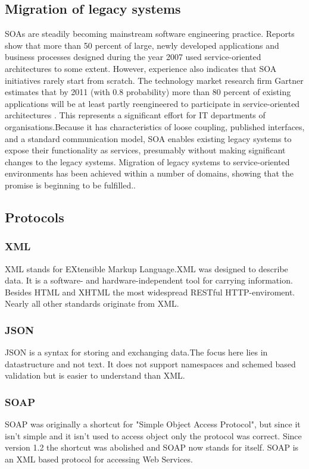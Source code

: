 \documentclass[12pt]{article}
\begin{document}
\subsection{Migration of legacy systems}
SOAs are steadily becoming mainstream software engineering practice. Reports show that more than 50 percent of large, newly developed applications and business processes designed during the year 2007 used service-oriented architectures to some extent. However, experience also indicates that SOA initiatives rarely start from scratch. The technology market research firm Gartner estimates that by 2011 (with 0.8 probability) more than 80 percent of existing applications will be at least partly reengineered to participate in service-oriented architectures . This represents a significant effort for IT departments of organisations.Because it has characteristics of loose coupling, published interfaces, and a standard communication model, SOA enables existing legacy systems to expose their functionality as services, presumably without making significant changes to the legacy systems. Migration of legacy systems to service-oriented environments has been achieved within a number of domains, showing that the promise is beginning to be fulfilled.\cite{legacy}.
\\
\subsection{Protocols}

\subsubsection{XML}
XML stands for EXtensible Markup Language.XML was designed to describe data.
It is a software- and hardware-independent tool for carrying information.\\
Besides HTML and XHTML the most widespread RESTful HTTP-enviroment.\\
Nearly all other standards originate from XML.
\subsubsection{JSON}
JSON is a syntax for storing and exchanging data.The focus here lies in datastructure and not text.
It does not support namespaces and schemed based validation but is easier to understand than XML.
\subsubsection{SOAP}
SOAP was originally a shortcut for "Simple Object Access Protocol", but since it isn't simple 
and it isn't used to access object only the protocol was correct. Since version 1.2 the shortcut
was abolished and SOAP now stands for itself. SOAP is an XML based protocol for accessing Web Services.
\end{document}
